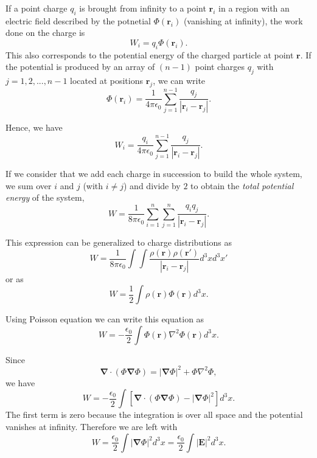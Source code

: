 If a point charge $q_i$ is brought from infinity to a point $\textbf{r}_i$ in a region with an electric field described by the potnetial $\Phi(\textbf{r}_i)$ (vanishing at infinity), the work done on the charge is 
\begin{equation}
W_i = q_i \Phi(\textbf{r}_i).
\end{equation}
This also corresponds to the potential energy of the charged particle at point $\textbf{r}$. If the potential is produced by an array of $(n-1)$ point charges $q_j$ with $j=1,2,...,n-1$ located at positions $\textbf{r}_j$, we can write
\begin{equation}
\Phi (\textbf{r}_i) = \frac{1}{4\pi \epsilon_0} \sum_{j=1}^{n-1} \frac{q_j}{\left| \textbf{r}_i - \textbf{r}_j \right|} .
\end{equation}

Hence, we have
\begin{equation}
W_i =  \frac{q_i}{4\pi \epsilon_0} \sum_{j=1}^{n-1} \frac{q_j}{\left| \textbf{r}_i - \textbf{r}_j \right|}.
\end{equation}

If we consider that we add each charge in succession to build the whole system, we sum over $i$ and $j$ (with $i\neq j$) and divide by $2$ to obtain the \textit{total potential energy} of the system,
\begin{equation}
W =  \frac{1}{8 \pi \epsilon_0} \sum_{i=1}^{n} \sum_{j=1}^{n} \frac{q_i q_j}{\left| \textbf{r}_i - \textbf{r}_j \right|}.
\end{equation}

This expression can be generalized to charge distributions as
\begin{equation}
W =  \frac{1}{8 \pi \epsilon_0} \int \int \frac{\rho(\textbf{r}) \rho(\textbf{r}')}{\left| \textbf{r}_i - \textbf{r}_j \right|} d^3x d^3x'
\end{equation}
or as
\begin{equation}
W =  \frac{1}{2} \int \rho(\textbf{r}) \Phi(\textbf{r}) d^3x.
\end{equation}

Using Poisson equation we can write this equation as
\begin{equation}
W =  -\frac{\epsilon_0}{2} \int  \Phi(\textbf{r}) \nabla^2 \Phi (\textbf{r}) d^3x.
\end{equation}

Since 
\begin{equation}
\boldsymbol{\nabla} \cdot (\Phi \boldsymbol{\nabla} \Phi) = \left| \boldsymbol{\nabla} \Phi \right| ^2 + \Phi \nabla^2 \Phi,
\end{equation}
we have 
\begin{equation}
W =  -\frac{\epsilon_0}{2} \int \left[ \boldsymbol{\nabla} \cdot (\Phi \boldsymbol{\nabla} \Phi) - \left| \boldsymbol{\nabla} \Phi \right| ^2 \right] d^3x.
\end{equation}
The first term is zero because the integration is over all space and  the potential vanishes at infinity. Therefore we are left with
\begin{equation}
W =  \frac{\epsilon_0}{2} \int \left| \boldsymbol{\nabla} \Phi \right| ^2 d^3x = \frac{\epsilon_0}{2} \int \left| \textbf{E} \right| ^2 d^3x .
\end{equation}
 
